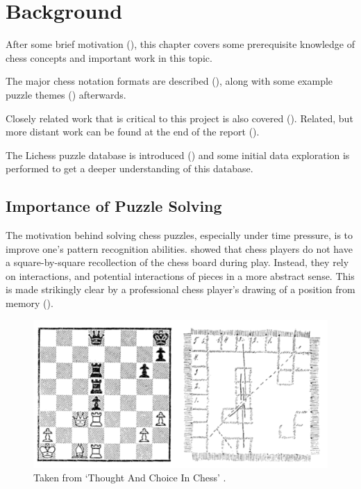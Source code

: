 \chapter{Background}\label{backgroundChapter}

After some brief motivation (), this chapter covers some prerequisite
knowledge of chess concepts and important work in this topic.

The major chess notation formats are described (), along with some
example puzzle themes () afterwards.

Closely related work that is critical to this project is also covered
(). Related, but more distant work can be found at the end of the
report ().

The Lichess puzzle database is introduced () and some initial data
exploration is performed to get a deeper understanding of this database.

\section{Importance of Puzzle Solving}\label{bg1}

The motivation behind solving chess puzzles, especially under time pressure, is
to improve one's pattern recognition abilities. \citet{thoughtAndChoice} showed
that chess players do not have a square-by-square recollection of the chess
board during play. Instead, they rely on interactions, and potential
interactions of pieces in a more abstract sense. This is made strikingly clear
by a professional chess player's drawing of a position from memory
().

\begin{figure}[H]
  \centering
  \includegraphics[width=0.9\linewidth]{background/img/deGroot.png}
  \caption{Taken from `Thought And Choice In Chess'
  \citep{thoughtAndChoice}.}
  \label{deGrootFigure}
\end{figure}

